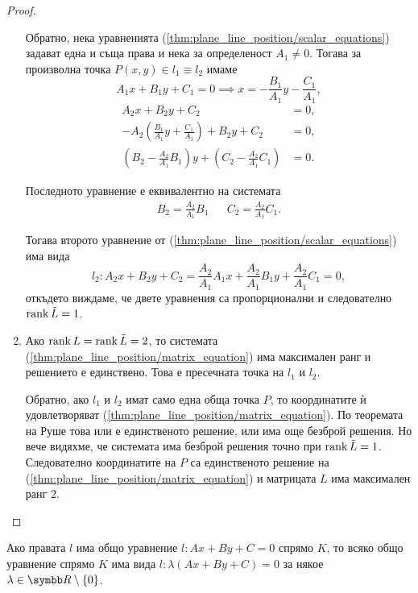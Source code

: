 \documentclass[numbers=endperiod, bibliography=totocnumbered]{scrartcl}
\begin{document}
\begin{proof}
\begin{enumerate}
    Обратно, нека уравненията (\ref{thm:plane_line_position/scalar_equations}) задават една и съща права и нека за определеност \( A_1 \neq 0 \). Тогава за произволна точка \( P(x, y) \in l_1 \equiv l_2 \) имаме
    \begin{equation*}
      A_1x + B_1y + C_1 = 0
      \implies
      x = - \frac {B_1} {A_1} y - \frac {C_1} {A_1},
    \end{equation*}
    \begin{align*}
      A_2x + B_2y + C_2 &= 0,
      \\
      - A_2 \left(\frac {B_1} {A_1} y + \frac {C_1} {A_1} \right) + B_2y + C_2 &= 0,
      \\
      \left(B_2 - \frac {A_2} {A_1} B_1 \right) y + \left(C_2 - \frac {A_2} {A_1} C_1 \right) &= 0.
    \end{align*}

    Последното уравнение е еквивалентно на системата
    \begin{align*}
      B_2 = \frac {A_2} {A_1} B_1
      &&
      C_2 = \frac {A_2} {A_1} C_1.
    \end{align*}

    Тогава второто уравнение от (\ref{thm:plane_line_position/scalar_equations}) има вида
    \begin{equation*}
      l_2:
      A_2 x + B_2 y + C_2 =
      \frac {A_2} {A_1} A_1 x + \frac {A_2} {A_1} B_1 y + \frac {A_2} {A_1} C_1
      = 0,
    \end{equation*}
    откъдето виждаме, че двете уравнения са пропорционални и следователно \( \operatorname{rank} \tilde L = 1 \).

    \item Ако \( \operatorname{rank} L = \operatorname{rank} \tilde L = 2 \), то системата (\ref{thm:plane_line_position/matrix_equation}) има максимален ранг и решението е единствено. Това е пресечната точка на \( l_1 \) и \( l_2 \).

    Обратно, ако \( l_1 \) и \( l_2 \) имат само една обща точка \( P \), то координатите ѝ удовлетворяват (\ref{thm:plane_line_position/matrix_equation}). По теоремата на Руше това или е единственото решение, или има още безброй решения. Но вече видяхме, че системата има безброй решения точно при \( \operatorname{rank} \tilde L = 1 \). Следователно координатите на \( P \) са единственото решение на (\ref{thm:plane_line_position/matrix_equation}) и матрицата \( L \) има максимален ранг 2.
  \end{enumerate}
\end{proof}

\begin{corollary}
  Ако правата \( l \) има общо уравнение \( l: Ax + By + C = 0 \) спрямо \( K \), то всяко общо уравнение спрямо \( K \) има вида \( l: \lambda(Ax + By + C) = 0 \) за някое \( \lambda \in \R \setminus \{ 0 \} \).
\end{corollary}
\end{document}
